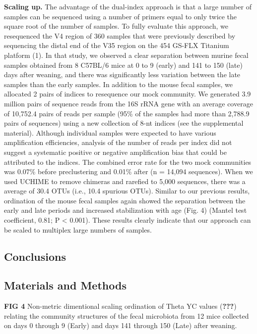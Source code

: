 \documentclass[11pt,]{article}
\begin{document}
\textbf{Scaling up.} The advantage of the dual-index approach is that a
large number of samples can be sequenced using a number of primers equal
to only twice the square root of the number of samples. To fully
evaluate this approach, we resequenced the V4 region of 360 samples that
were previously described by sequencing the distal end of the V35 region
on the 454 GS-FLX Titanium platform (1). In that study, we observed a
clear separation between murine fecal samples obtained from 8 C57BL/6
mice at 0 to 9 (early) and 141 to 150 (late) days after weaning, and
there was significantly less variation between the late samples than the
early samples. In addition to the mouse fecal samples, we allocated 2
pairs of indices to resequence our mock community. We generated 3.9
million pairs of sequence reads from the 16S rRNA gene with an average
coverage of 10,752.4 pairs of reads per sample (95\% of the samples had
more than 2,788.9 pairs of sequences) using a new collection of 8-nt
indices (see the supplemental material). Although individual samples
were expected to have various amplification efficiencies, analysis of
the number of reads per index did not suggest a systematic positive or
negative amplification bias that could be attributed to the indices. The
combined error rate for the two mock communities was 0.07\% before
preclustering and 0.01\% after (n = 14,094 sequences). When we used
UCHIME to remove chimeras and rarefied to 5,000 sequences, there was a
average of 30.4 OTUs (i.e., 10.4 spurious OTUs). Similar to our previous
results, ordination of the mouse fecal samples again showed the
separation between the early and late periods and increased
stabilization with age (Fig. 4) (Mantel test coefficient, 0.81; P
\textless{} 0.001). These results clearly indicate that our approach can
be scaled to multiplex large numbers of samples.

\subsection{Conclusions}\label{conclusions}

\subsection{Materials and Methods}\label{materials-and-methods}

\newpage

\textbf{FIG 4} Non-metric dimentional scaling ordination of Theta YC
values ({\textbf{???}}) relating the community structures of the fecal
microbiota from 12 mice collected on days 0 through 9 (Early) and days
141 through 150 (Late) after weaning.
\end{document}
